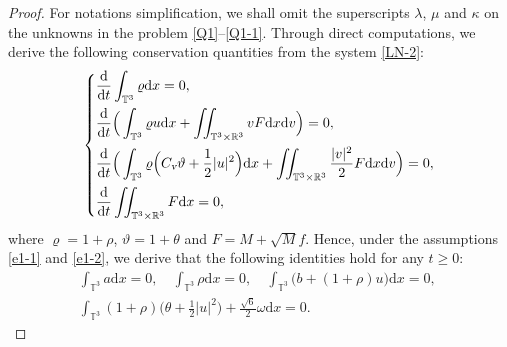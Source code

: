 \documentclass[reqno,11pt]{amsart}
\theoremstyle{plain}
\numberwithin{equation}{section}
\begin{document}
\begin{proof}%
For notations simplification, we shall  omit  the superscripts 
$\lambda$, $\mu$ and $\kappa$ on the unknowns in  the problem \eqref{Q1}--\eqref{Q1-1}.  
 Through   direct computations, we  derive the following conservation quantities from the system \eqref{LN-2}:
\begin{equation*}
\left\{
\begin{aligned}
&\frac{\mathrm{d}}{\mathrm{d} t} \int_{\mathbb{T}^3} \varrho \mathrm{d} x=0,\\
& \frac{\mathrm{d}}{\mathrm{d} t}\Big(\int_{\mathbb{T}^3} \varrho u \mathrm{d} x
+\iint_{\mathbb{T}^3\times\mathbb{R}^3} v F \mathrm{d} x \mathrm{d} v\Big)=0, \\
& \frac{\mathrm{d}}{\mathrm{d} t}\Big(\int_{\mathbb{T}^3} \varrho\Big(C_\textsl{v} 
\vartheta+\frac{1}{2}|u|^2\Big)
 \mathrm{d} x
+\iint_{\mathbb{T}^3\times\mathbb{R}^3} \frac{|v|^2}{2} F \mathrm{d} x \mathrm{d} v \Big)=0,\\
& \frac{\mathrm{d}}{\mathrm{d}t}\iint_{\mathbb{T}^3\times\mathbb{R}^3}F\mathrm{d}x=0,
\end{aligned}\right.
\end{equation*}
where $\varrho=1+\rho$, $\vartheta =1+\theta$ and $F=M+\sqrt{M}f$. Hence, under the assumptions
 \eqref{e1-1} and \eqref{e1-2}, we derive that the following identities hold for any $t \geq 0$:  
\begin{gather}
 \int_{\mathbb{T}^3} a \mathrm{d} x=0, \quad
 \int_{\mathbb{T}^3} \rho \mathrm{d} x=0, \quad
\int_{\mathbb{T}^3}\big(b+(1+\rho) u\big) \mathrm{d} x=0,\,\,\label{G6.1-1}\\
 \int_{\mathbb{T}^3}(1+\rho)\Big(\theta+\frac{1}{2}|u|^2\Big)+\frac{\sqrt{6}}{2}
  \omega \mathrm{d} x=0.\label{G6.1-2}
\end{gather}



\end{proof}
\end{document}
